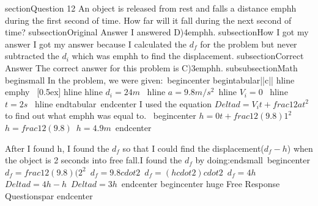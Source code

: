 section{Question 12}
	An object is released from rest and falls a distance emph{h} during the first second of time. How far will it fall during the next second of time?
	subsection{Original Answer}
	I answered D)4emph{h}.
	subsection{How I got my answer}
	I got my answer because I calculated the $d_{f}$ for the problem but never subtracted the $d_{i}$ which was emph{h} to find the displacement.
	subsection{Correct Answer}
	The correct answer for this problem is C)3emph{h}.
	subsubsection{Math}
begin{small}
In the problem, we were given:\
begin{center}
begin{tabular}{||c||} 
 hline
 emph{y} \ [0.5ex] 
 hline
 hline
$d_{i} = 24m$ \ 
 hline
$a = 9.8 m/s^{2}$\
 hline
$V_{i} = 0$ \
 hline
$t = 2s$ \
hline
end{tabular}\
end{center}
I used the equation $Delta d = V_{i} t + frac{1}{2}at^{2}$ to find out what emph{h} was equal to. \
begin{center}
$h=0t+frac{1}{2}(9.8)1^{2}$\
$h=frac{1}{2}(9.8)$\
$h=4.9m$\ 
end{center}

After I found h, I found the $d_{f}$ so that I could find the displacement($ d_{f}-h $) when the object is 2 seconds into free fall.I found the $d_{f}$ by doing:end{small}\
begin{center}
$d_{f}=frac{1}{2}(9.8)(2^{2}$\
$d_{f}=9.8cdot2$\
$d_{f}= (hcdot2)cdot2$\
$d_{f}=4h$\
$Delta d = 4h - h$\
$Delta d = 3h$\
end{center}
begin{center}
{huge Free Response Questionspar}
end{center}
    
